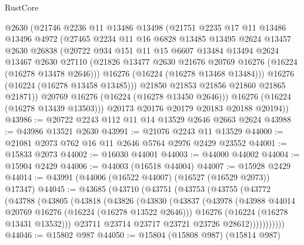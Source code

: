 \begin{lexlean}{RustCore}
\begin{coremodule}
            @2630
            (@21746
              @2236
              @11
              @13486
              @13498
              (@21751
                @2235
                @17
                @11
                @13486
                @13496
                @4972
                (@27465
                  @2234
                  @11
                  @16
                  @6828
                  @13485
                  @13495
                  @2624
                  @13457
                  @2630
                  @26838
                  (@20722
                    @934
                    @151
                    @11
                    @15
                    @6607
                    @13484
                    @13494
                    @2624
                    @13467
                    @2630
                    @27110
                    (@21826 @13477 @2630 @21676 @20769 @16276 (@16224 (@16278 @13478 @2646)))
                    @16276
                    (@16224 (@16278 @13468 @13484)))
                  @16276
                  (@16224 (@16278 @13458 @13485)))
                @21850
                @21853
                @21856
                @21860
                @21865
                @21871))
            @20769
            @16276
            (@16224 (@16278 @13450 @2646)))
          @16276
          (@16224 (@16278 @13439 @13503)))
        @20173
        @20176
        @20179
        @20183
        @20188
        @20194))
@43986 := @20722 @2243 @112 @11 @14 @13529 @2646 @2663 @2624
@43988 := @43986 @13521 @2630
@43991 := @21076 @2243 @11 @13529
@44000 := @21081 @2073 @762 @16 @11 @2646 @5764 @2976 @2429 @23552
@44001 := @15833 @2073
@44002 := @16030 @44001
@44003 := @44000 @44002
@44004 := @15904 @2429
@44006 := @44003 (@16518 @44004)
@44007 := @15928 @2429
@44014 := @43991 (@44006 (@16522 @44007) (@16527 (@16529 @2073)) @17347)
@44045 := @43685
    (@43710
      (@43751
        (@43753
          (@43755
            (@43772
              (@43788
                (@43805
                  (@43818
                    (@43826
                      (@43830
                        (@43837
                          (@43978
                            (@43988 @44014 @20769 @16276 (@16224 (@16278 @13522 @2646)))
                            @16276
                            (@16224 (@16278 @13431 @13532)))
                          @23711
                          @23714
                          @23717
                          @23721
                          @23726
                          @28612)))))))))))
@44046 := @15802 @987
@44050 := @15804 (@15808 @987) (@15814 @987)

\end{coremodule}
\end{lexlean}

